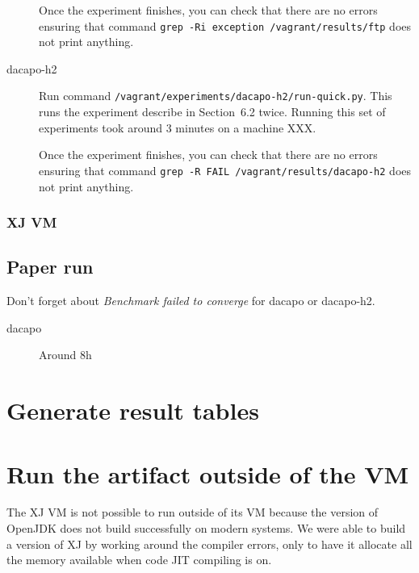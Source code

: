 \documentclass[12pt]{article}
\begin{document}
\begin{description}
        Once the experiment finishes, you can check that there are no errors
        ensuring that command \texttt{grep -Ri exception /vagrant/results/ftp}
        does not print anything.

    \item[dacapo-h2] Run command
        \texttt{/vagrant/experiments/dacapo-h2/run-quick.py}.  This runs the
        experiment describe in Section~6.2 twice.  Running this set of
        experiments took around 3 minutes on a machine XXX.

        Once the experiment finishes, you can check that there are no errors
        ensuring that command \texttt{grep -R FAIL /vagrant/results/dacapo-h2}
        does not print anything.

\end{description}

\subsubsection{XJ VM}

\subsection{Paper run}
\label{sec:paper-run}

Don't forget about \emph{Benchmark failed to converge} for dacapo or dacapo-h2.

\begin{description}

    \item[dacapo] Around 8h

\end{description}

\section{Generate result tables}
\label{sec:tables}

\section{Run the artifact outside of the VM}

The XJ VM is not possible to run outside of its VM because the version of
OpenJDK does not build successfully on modern systems.  We were able to build a
version of XJ by working around the compiler errors, only to have it allocate
all the memory available when code JIT compiling is on.
\end{document}
